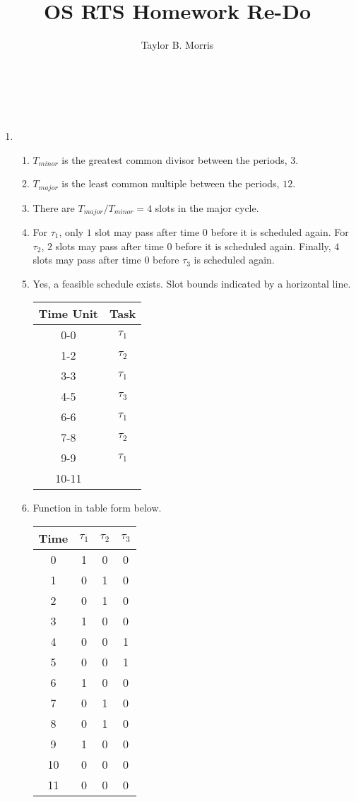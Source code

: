 \documentclass[12pt,letterpaper]{report}
\author{Taylor B. Morris}
\title{OS RTS Homework Re-Do}
\begin{document}
\makeatletter
{\huge\noindent\@title\large\\\@author\\\@date}
\makeatother
\begin{enumerate}

\item
\begin{enumerate}
\item $T_{minor}$ is the greatest common divisor between the periods, $3$.
\item $T_{major}$ is the least common multiple between the periods, $12$.
\item There are $T_{major}/T_{minor}=4$ slots in the major cycle.
\item For $\tau_1$, only $1$ slot may pass after time $0$ before it is scheduled again. For $\tau_2$, $2$ slots may pass after time $0$ before it is scheduled again. Finally, $4$ slots may pass after time $0$ before $\tau_3$ is scheduled again.
\item Yes, a feasible schedule exists. Slot bounds indicated by a horizontal line.\\
\begin{tabular}{|c|c|}
\hline
Time Unit & Task \\
\hline
0-0 & $\tau_1$ \\
1-2 & $\tau_2$ \\
\hline
3-3 & $\tau_1$ \\
4-5 & $\tau_3$ \\
\hline 
6-6 & $\tau_1$ \\
7-8 & $\tau_2$ \\
\hline
9-9 & $\tau_1$ \\
10-11 & \\
\hline
\end{tabular}
\item Function in table form below.\\
\begin{tabular}{|c||c|c|c|}
\hline
Time & $\tau_1$ & $\tau_2$ & $\tau_3$ \\
\hline\hline
0 & 1 & 0 & 0\\
1 & 0 & 1 & 0\\
2 & 0 & 1 & 0\\
3 & 1 & 0 & 0\\
4 & 0 & 0 & 1\\
5 & 0 & 0 & 1\\
6 & 1 & 0 & 0\\
7 & 0 & 1 & 0\\
8 & 0 & 1 & 0\\
9 & 1 & 0 & 0\\
10 & 0 & 0 & 0\\
11 & 0 & 0 & 0\\
\hline
\end{tabular}
\end{enumerate}


\end{enumerate}
\end{document}
